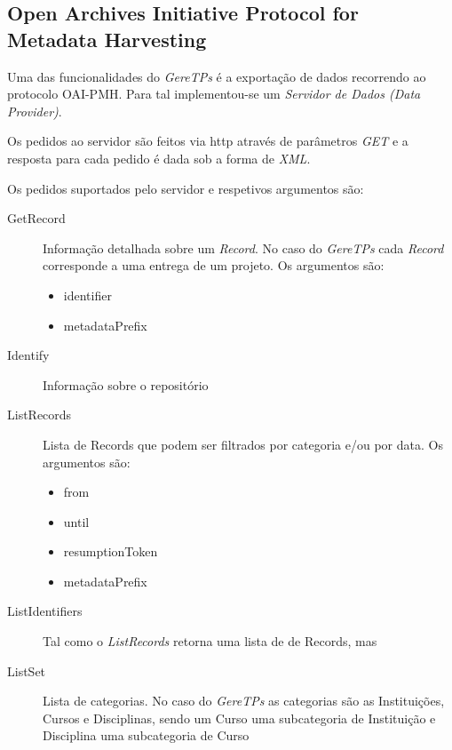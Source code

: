 \subsection{Open Archives Initiative Protocol for Metadata Harvesting} %
\label{sub:open_archives_initiative_protocol_for_metadata_harvesting}

Uma das funcionalidades do \emph{GereTPs} é a exportação de dados recorrendo ao protocolo OAI-PMH. Para tal implementou-se um \emph{Servidor de Dados (Data Provider)}.

Os pedidos ao servidor são feitos via http através de parâmetros \emph{GET} e a resposta para cada pedido é dada sob a forma de \emph{XML}.

Os pedidos suportados pelo servidor e respetivos argumentos são:

\begin{description}
	\item[GetRecord] Informação detalhada sobre um \emph{Record}. No caso do \emph{GereTPs} cada \emph{Record} corresponde a uma entrega de um projeto. Os argumentos são:
	\begin{itemize}
		\item identifier
		\item metadataPrefix
	\end{itemize}

	\item[Identify] Informação sobre o repositório

	\item[ListRecords] Lista de Records que podem ser filtrados por categoria e/ou por data. Os argumentos são:
	\begin{itemize}
	  	\item from
	  	\item until
	  	\item resumptionToken
	  	\item metadataPrefix
	\end{itemize}

	\item[ListIdentifiers] Tal como o \emph{ListRecords} retorna uma lista de de Records, mas

	\item[ListSet] Lista de categorias. No caso do \emph{GereTPs} as categorias são as Instituições, Cursos e Disciplinas, sendo um Curso uma subcategoria de Instituição e Disciplina uma subcategoria de Curso
\end{description}


